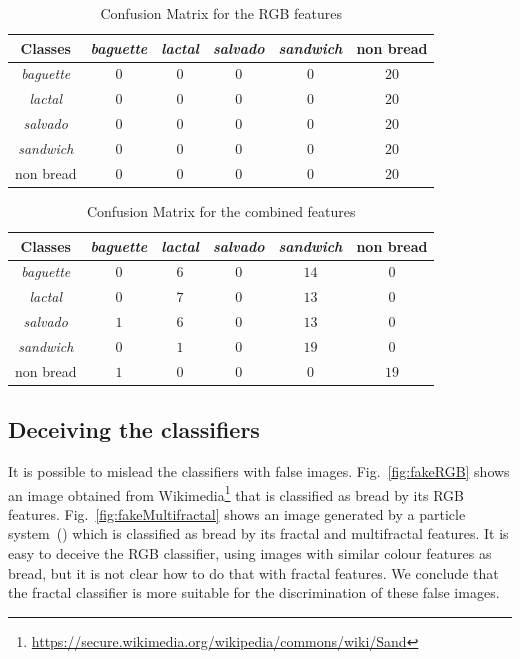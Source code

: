 \documentclass[oneside,a4paper,english,links]{amca}
\begin{document}
\begin{table}[htb]
\centering
\begin{tabular}{|c|c|c|c|c|c|}
    \hline
    Classes & {\em baguette} & {\em lactal} & {\em salvado} & {\em sandwich} & non bread\\
    \hline
    \hline
    {\em baguette}  & $0$ & $0$ & $0$ & $0$ & $20$\\
    \hline
    {\em lactal}    & $0$ & $0$ & $0$ & $0$ & $20$\\
    \hline
    {\em salvado}   & $0$ & $0$ & $0$ & $0$ & $20$\\
    \hline
    {\em sandwich}  & $0$ & $0$ & $0$ & $0$ & $20$\\
    \hline
    non bread       & $0$ & $0$ & $0$ & $0$ & $20$\\
    \hline
\end{tabular}
\caption{Confusion Matrix for the RGB features}
\label{table:ConfusionMatrixNonFractal}
\end{table}

\begin{table}[ht!b]
\centering
\begin{tabular}{|c|c|c|c|c|c|}
    \hline
    Classes & {\em baguette} & {\em lactal} & {\em salvado} & {\em sandwich} & non bread\\
    \hline
    \hline
    {\em baguette}   & $0$ & $6$ & $0$ & $14$ & $0$\\
    \hline
    {\em lactal}     & $0$ & $7$ & $0$ & $13$ & $0$\\
    \hline
    {\em salvado}    & $1$ & $6$ & $0$ & $13$ & $0$\\
    \hline
    {\em sandwich}   & $0$ & $1$ & $0$ & $19$ & $0$\\
    \hline
    non bread        & $1$ & $0$ & $0$ & $0$  & $19$\\
    \hline
\end{tabular}
\caption{Confusion Matrix for the combined features}
\label{table:ConfusionMatrixCombined}
\end{table}

\subsection{Deceiving the classifiers}
It is possible to mislead the classifiers with false images. Fig.~\ref{fig:fakeRGB} shows an image obtained from Wikimedia\footnote{\url{https://secure.wikimedia.org/wikipedia/commons/wiki/Sand}} that is classified as bread by its RGB features. Fig.~\ref{fig:fakeMultifractal} shows an image generated by a particle system~(\cite{Baravalle2011}) which is classified as bread by its fractal and multifractal features. It is easy to deceive the RGB classifier, using images with similar colour features as bread, but it is not clear how to do that with fractal features. We conclude that the fractal classifier is more suitable for the discrimination of these false images.
\end{document}
